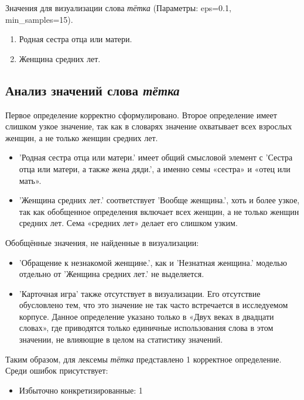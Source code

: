 Значения для визуализации слова \textit{тётка} (Параметры: eps=0.1, min\_samples=15).

\begin{enumerate}
    \item Родная сестра отца или матери.
    \item Женщина средних лет.
\end{enumerate}

\subsection*{Анализ значений слова \textit{тётка}}

Первое определение корректно сформулировано.
Второе определение имеет слишком узкое значение, так как в словарях значение охватывает всех взрослых женщин,
а не только женщин средних лет.

\begin{itemize}
    \item ’Родная сестра отца или матери.’ имеет общий смысловой элемент с
’Сестра отца или матери, а также жена дяди.’, а именно семы «сестра» и «отец или мать».

    \item ’Женщина средних лет.’ соответствует ’Вообще женщина.’, хоть и более узкое,
так как обобщенное определения включает всех женщин, а не только женщин средних лет.
Сема «средних лет» делает его слишком узким.
\end{itemize}

Обобщённые значения, не найденные в визуализации:
\begin{itemize}
    \item ’Обращение к незнакомой женщине.’, как и ’Незнатная женщина.’ моделью отдельно от
’Женщина средних лет.’ не выделяется.

    \item ’Карточная игра’ также отсутствует в визуализации.
Его отсутствие обусловлено тем, что это значение не так часто встречается в исследуемом корпусе.
Данное определение указано только в «Двух веках в двадцати словах», где приводятся только
единичные использования слова в этом значении, не влияющие в целом на статистику значений.
\end{itemize}

Таким образом, для лексемы \textit{тётка} представлено 1 корректное определение.
Среди ошибок присутствует:
\begin{itemize}
    \item Избыточно конкретизированные: 1
\end{itemize}

